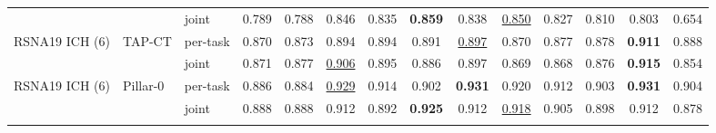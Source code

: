 \begin{tabular}{lllccccccccccc}
 &  & joint & 0.789 & \cellcolor{modebest}0.788 & \cellcolor{modebest}0.846 & \cellcolor{modebest}0.835 & \cellcolor{modebest}\textbf{0.859} & 0.838 & \cellcolor{modebest}\underline{0.850} & \cellcolor{modebest}0.827 & \cellcolor{modebest}0.810 & \cellcolor{modebest}0.803 & \cellcolor{modebest}0.654 \\
\addlinespace[2pt]
RSNA19 ICH (6) & TAP-CT & per-task & 0.870 & 0.873 & 0.894 & 0.894 & \cellcolor{modebest}0.891 & \underline{0.897} & \cellcolor{modebest}0.870 & \cellcolor{modebest}0.877 & \cellcolor{modebest}0.878 & \textbf{0.911} & \cellcolor{modebest}0.888 \\
 &  & joint & \cellcolor{modebest}0.871 & \cellcolor{modebest}0.877 & \cellcolor{modebest}\underline{0.906} & \cellcolor{modebest}0.895 & 0.886 & 0.897 & 0.869 & 0.868 & 0.876 & \cellcolor{modebest}\textbf{0.915} & 0.854 \\
\addlinespace[2pt]
RSNA19 ICH (6) & Pillar-0 & per-task & 0.886 & 0.884 & \cellcolor{modebest}\underline{0.929} & \cellcolor{modebest}0.914 & 0.902 & \cellcolor{modebest}\textbf{0.931} & \cellcolor{modebest}0.920 & \cellcolor{modebest}0.912 & \cellcolor{modebest}0.903 & \cellcolor{modebest}\textbf{0.931} & \cellcolor{modebest}0.904 \\
 &  & joint & \cellcolor{modebest}0.888 & \cellcolor{modebest}0.888 & 0.912 & 0.892 & \cellcolor{modebest}\textbf{0.925} & 0.912 & \underline{0.918} & 0.905 & 0.898 & 0.912 & 0.878 \\
\addlinespace[2pt]
\bottomrule
\end{tabular}
